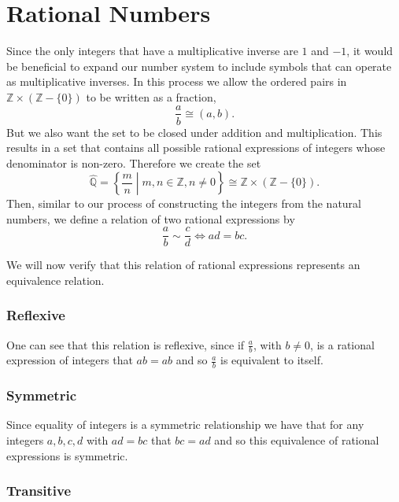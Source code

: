 \documentclass[
]{book}
\theoremstyle{definition}
\theoremstyle{definition}
\theoremstyle{definition}
\theoremstyle{definition}
\theoremstyle{remark}
\begin{document}
\hypertarget{sec:rationals}{%
\section{Rational Numbers}\label{sec:rationals}}

Since the only integers that have a multiplicative inverse are \(1\) and \(-1\), it would be beneficial to expand our number system to include symbols that can operate as multiplicative inverses. In this process we allow the ordered pairs in \(\mathbb{Z}\times (\mathbb{Z}-\{0\})\) to be written as a fraction, \[\frac{a}{b}\cong (a,b).\]
But we also want the set to be closed under addition and multiplication. This results in a set that contains all possible rational expressions of integers whose denominator is non-zero. Therefore we create the set \[\widehat{\mathbb{Q}}= \left\{ \frac{m}{n}\middle \vert m,n \in \mathbb{Z}, n\neq 0\right\} \cong \mathbb{Z}\times (\mathbb{Z}-\{0\}).\] Then, similar to our process of constructing the integers from the natural numbers, we define a relation of two rational expressions by
\[\frac{a}{b} \sim \frac{c}{d} \Leftrightarrow ad=bc.\]

We will now verify that this relation of rational expressions represents an equivalence relation.

\hypertarget{reflexive}{%
\subsubsection*{Reflexive}\label{reflexive}}

One can see that this relation is reflexive, since if \(\frac{a}{b}\), with \(b\neq 0\), is a rational expression of integers that \(ab=ab\) and so \(\frac{a}{b}\) is equivalent to itself.

\hypertarget{symmetric}{%
\subsubsection*{Symmetric}\label{symmetric}}

Since equality of integers is a symmetric relationship we have that for any integers \(a,b,c,d\) with \(ad=bc\) that \(bc=ad\) and so this equivalence of rational expressions is symmetric.

\hypertarget{transitive}{%
\subsubsection*{Transitive}\label{transitive}}
\end{document}
